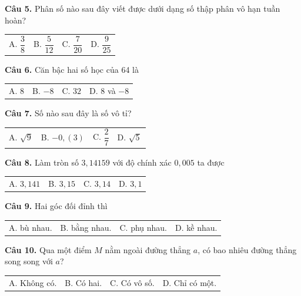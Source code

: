 \documentclass[10.5pt,a4paper]{article}
\begin{document}
\vspace{1mm}
\noindent\textbf{Câu 5.} Phân số nào sau đây viết được dưới dạng số thập phân vô hạn tuần hoàn?\\
\begin{tabularx}{\linewidth}{X X X X}
A. $\dfrac{3}{8}$ & B. $\dfrac{5}{12}$ & C. $\dfrac{7}{20}$ & D. $\dfrac{9}{25}$
\end{tabularx}

\vspace{1mm}
\noindent\textbf{Câu 6.} Căn bậc hai số học của 64 là\\
\begin{tabularx}{\linewidth}{X X X X}
A. $8$ & B. $-8$ & C. $32$ & D. $8$ và $-8$
\end{tabularx}

\vspace{1mm}
\noindent\textbf{Câu 7.} Số nào sau đây là số vô tỉ?\\
\begin{tabularx}{\linewidth}{X X X X}
A. $\sqrt{9}$ & B. $-0,(3)$ & C. $\dfrac{2}{7}$ & D. $\sqrt{5}$
\end{tabularx}

\vspace{1mm}
\noindent\textbf{Câu 8.} Làm tròn số $3,14159$ với độ chính xác $0,005$ ta được\\
\begin{tabularx}{\linewidth}{X X X X}
A. $3,141$ & B. $3,15$ & C. $3,14$ & D. $3,1$
\end{tabularx}

\vspace{1mm}
\noindent\textbf{Câu 9.} Hai góc đối đỉnh thì\\
\begin{tabularx}{\linewidth}{X X X X}
A. bù nhau. & B. bằng nhau. & C. phụ nhau. & D. kề nhau.
\end{tabularx}

\vspace{1mm}
\noindent\textbf{Câu 10.} Qua một điểm $M$ nằm ngoài đường thẳng $a$, có bao nhiêu đường thẳng song song với $a$?\\
\begin{tabularx}{\linewidth}{X X X X}
A. Không có. & B. Có hai. & C. Có vô số. & D. Chỉ có một.
\end{tabularx}
\end{document}
